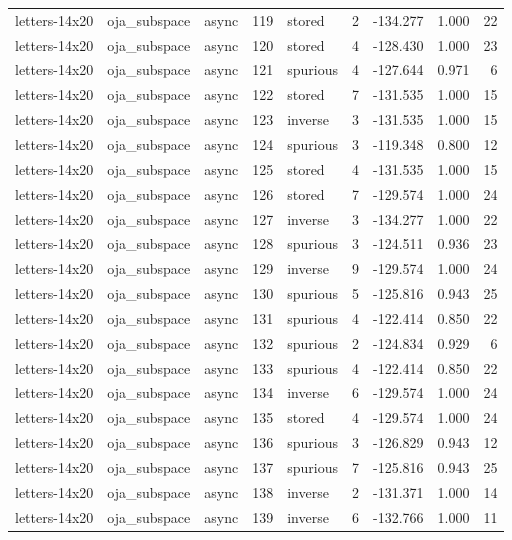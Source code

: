 \begin{tabular}{lllrlrrrr}
letters-14x20 & oja\_subspace & async & 119 & stored & 2 & -134.277 & 1.000 & 22 \\
letters-14x20 & oja\_subspace & async & 120 & stored & 4 & -128.430 & 1.000 & 23 \\
letters-14x20 & oja\_subspace & async & 121 & spurious & 4 & -127.644 & 0.971 & 6 \\
letters-14x20 & oja\_subspace & async & 122 & stored & 7 & -131.535 & 1.000 & 15 \\
letters-14x20 & oja\_subspace & async & 123 & inverse & 3 & -131.535 & 1.000 & 15 \\
letters-14x20 & oja\_subspace & async & 124 & spurious & 3 & -119.348 & 0.800 & 12 \\
letters-14x20 & oja\_subspace & async & 125 & stored & 4 & -131.535 & 1.000 & 15 \\
letters-14x20 & oja\_subspace & async & 126 & stored & 7 & -129.574 & 1.000 & 24 \\
letters-14x20 & oja\_subspace & async & 127 & inverse & 3 & -134.277 & 1.000 & 22 \\
letters-14x20 & oja\_subspace & async & 128 & spurious & 3 & -124.511 & 0.936 & 23 \\
letters-14x20 & oja\_subspace & async & 129 & inverse & 9 & -129.574 & 1.000 & 24 \\
letters-14x20 & oja\_subspace & async & 130 & spurious & 5 & -125.816 & 0.943 & 25 \\
letters-14x20 & oja\_subspace & async & 131 & spurious & 4 & -122.414 & 0.850 & 22 \\
letters-14x20 & oja\_subspace & async & 132 & spurious & 2 & -124.834 & 0.929 & 6 \\
letters-14x20 & oja\_subspace & async & 133 & spurious & 4 & -122.414 & 0.850 & 22 \\
letters-14x20 & oja\_subspace & async & 134 & inverse & 6 & -129.574 & 1.000 & 24 \\
letters-14x20 & oja\_subspace & async & 135 & stored & 4 & -129.574 & 1.000 & 24 \\
letters-14x20 & oja\_subspace & async & 136 & spurious & 3 & -126.829 & 0.943 & 12 \\
letters-14x20 & oja\_subspace & async & 137 & spurious & 7 & -125.816 & 0.943 & 25 \\
letters-14x20 & oja\_subspace & async & 138 & inverse & 2 & -131.371 & 1.000 & 14 \\
letters-14x20 & oja\_subspace & async & 139 & inverse & 6 & -132.766 & 1.000 & 11 \\

\end{tabular}
